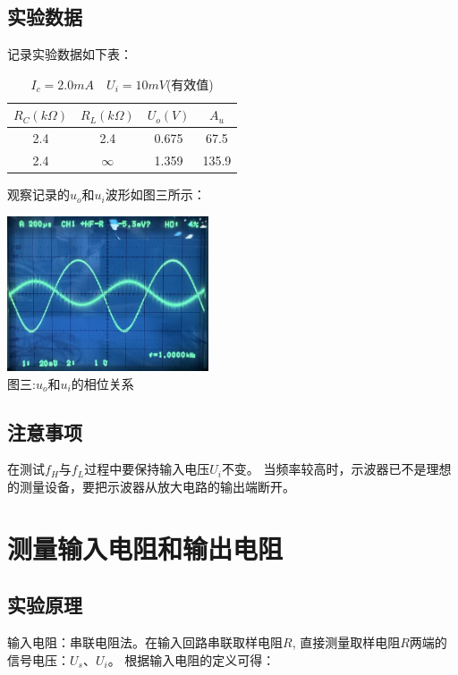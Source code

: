 \documentclass[a4paper]{article}
\begin{document}
    \subsection{实验数据}\label{subsec:7}
    {{记录实验数据如下表：}}
    \begin{table}[htbp]
        \centering
        \caption{$I_c=2.0mA\quad U_i=10mV$(有效值)}
        \begin{tabular}{|c|c|c|c|}
            \hline
            $R_C(k\Omega)$ & $R_L(k\Omega)$ & $U_o(V)$ & $A_u$ \\
            \hline
            2.4            & 2.4            & 0.675    & 67.5  \\
            \hline
            2.4            & $\infty$       & 1.359    & 135.9 \\
            \hline
        \end{tabular}\label{tab:table3}
    \end{table}

    {{观察记录的$u_o$和$u_i$波形如图三所示：}}

    \begin{center}
        \includegraphics[height=130pt]{ref}\\
        {\small 图三:$u_o$和$u_i$的相位关系}
    \end{center}

    \subsection{注意事项}\label{subsec:8}
    {{在测试$f_H$与$f_L$过程中要保持输入电压$U_i$不变。}}
    {{当频率较高时，示波器已不是理想的测量设备，要把示波器从放大电路的输出端断开。}}
    \vspace{1cm}


    \section{测量输入电阻和输出电阻}\label{sec:5}

    \subsection{实验原理}\label{subsec:9}
    {{输入电阻：串联电阻法。在输入回路串联取样电阻$R$,
    直接测量取样电阻$R$两端的信号电压：$U_s$、$U_i$。
    根据输入电阻的定义可得：}}
\end{document}
